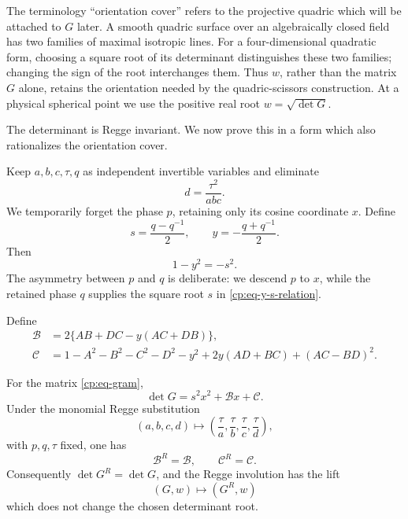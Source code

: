 The terminology ``orientation cover'' refers to the projective quadric
which will be attached to \(G\) later.  A smooth quadric surface over an
algebraically closed field has two families of maximal isotropic lines.  For
a four-dimensional quadratic form, choosing a square root of its
determinant distinguishes these two families; changing the sign of the root
interchanges them.  Thus \(w\), rather than the matrix \(G\) alone, retains
the orientation needed by the quadric-scissors construction.  At a physical
spherical point we use the positive real root \(w=\sqrt{\det G}\).

The determinant is Regge invariant.  We now prove this in a form which also
rationalizes the orientation cover.

Keep \(a,b,c,\tau,q\) as independent invertible variables and eliminate
\begin{equation}
 d=\frac{\tau^2}{abc}.
 \label{cp:eq-eliminate-d}
\end{equation}
We temporarily forget the phase \(p\), retaining only its cosine coordinate
\(x\).  Define
\begin{equation}
 s=\frac{q-q^{-1}}2,
 \qquad y=-\frac{q+q^{-1}}2.
 \label{cp:eq-q-and-s}
\end{equation}
Then
\begin{equation}
 1-y^2=-s^2.
 \label{cp:eq-y-s-relation}
\end{equation}
The asymmetry between \(p\) and \(q\) is deliberate: we descend \(p\) to
\(x\), while the retained phase \(q\) supplies the square root \(s\) in
\eqref{cp:eq-y-s-relation}.

Define
\begin{align}
 \mathcal B&=2\{AB+DC-y(AC+DB)\},
 \label{cp:eq-determinant-B}\\
 \mathcal C&=1-A^2-B^2-C^2-D^2-y^2
       +2y(AD+BC)+(AC-BD)^2.
 \label{cp:eq-determinant-C}
\end{align}

\begin{lemma}
\label{cp:lem-determinant-quadratic}
For the matrix \eqref{cp:eq-gram},
\begin{equation}
 \det G=s^2x^2+\mathcal Bx+\mathcal C.
 \label{cp:eq-determinant-quadratic}
\end{equation}
Under the monomial Regge substitution
\begin{equation}
 (a,b,c,d)\longmapsto
 \left(\frac\tau a,\frac\tau b,
       \frac\tau c,\frac\tau d\right),
 \label{cp:eq-moving-phase-regge}
\end{equation}
with \(p,q,\tau\) fixed, one has
\begin{equation}
 \mathcal B^R=\mathcal B,\qquad
 \mathcal C^R=\mathcal C.
 \label{cp:eq-determinant-coefficient-invariance}
\end{equation}
Consequently \(\det G^R=\det G\), and the Regge involution has the lift
\begin{equation}
 (G,w)\longmapsto(G^R,w)
 \label{cp:eq-oriented-regge-lift}
\end{equation}
which does not change the chosen determinant root.
\end{lemma}

